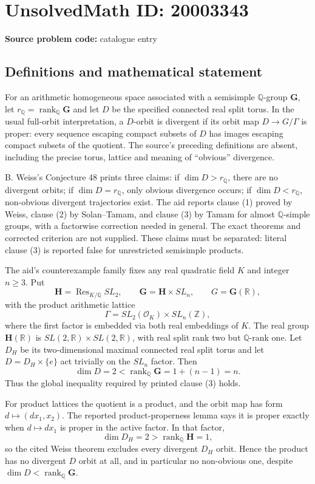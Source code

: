 \documentclass[11pt]{article}
\newcommand{\Z}{\mathbb{Z}}
\newcommand{\Q}{\mathbb{Q}}
\newcommand{\R}{\mathbb{R}}
\begin{document}
\section*{UnsolvedMath ID: 20003343}
\textbf{Source problem code:} catalogue entry
\subsection{Definitions and mathematical statement}
For an arithmetic homogeneous space associated with a semisimple $\Q$-group $\mathbf G$, let $r_{\Q}=\operatorname{rank}_{\Q}\mathbf G$ and let $D$ be the specified connected real split torus. In the usual full-orbit interpretation, a $D$-orbit is divergent if its orbit map $D\to G/\Gamma$ is proper: every sequence escaping compact subsets of $D$ has images escaping compact subsets of the quotient. The source's preceding definitions are absent, including the precise torus, lattice and meaning of ``obvious'' divergence.

B. Weiss's Conjecture 48 prints three claims: if $\dim D>r_{\Q}$, there are no divergent orbits; if $\dim D=r_{\Q}$, only obvious divergence occurs; if $\dim D<r_{\Q}$, non-obvious divergent trajectories exist. The aid reports clause (1) proved by Weiss, clause (2) by Solan--Tamam, and clause (3) by Tamam for almost $\Q$-simple groups, with a factorwise correction needed in general. The exact theorems and corrected criterion are not supplied. These claims must be separated: literal clause (3) is reported false for unrestricted semisimple products.

The aid's counterexample family fixes any real quadratic field $K$ and integer $n\geq3$. Put
\[
 \mathbf H=\operatorname{Res}_{K/\Q}SL_2,\qquad
 \mathbf G=\mathbf H\times SL_n,
 \qquad G=\mathbf G(\R),
\]
with the product arithmetic lattice
\[
 \Gamma=SL_2(\mathcal O_K)\times SL_n(\Z),
\]
where the first factor is embedded via both real embeddings of $K$. The real group $\mathbf H(\R)$ is $SL(2,\R)\times SL(2,\R)$, with real split rank two but $\Q$-rank one. Let $D_H$ be its two-dimensional maximal connected real split torus and let $D=D_H\times\{e\}$ act trivially on the $SL_n$ factor. Then
\[
 \dim D=2<\operatorname{rank}_{\Q}\mathbf G
 =1+(n-1)=n.
\]
Thus the global inequality required by printed clause (3) holds.

For product lattices the quotient is a product, and the orbit map has form $d\mapsto(dx_1,x_2)$. The reported product-properness lemma says it is proper exactly when $d\mapsto dx_1$ is proper in the active factor. In that factor,
\[
 \dim D_H=2>\operatorname{rank}_{\Q}\mathbf H=1,
\]
so the cited Weiss theorem excludes every divergent $D_H$ orbit. Hence the product has no divergent $D$ orbit at all, and in particular no non-obvious one, despite $\dim D<\operatorname{rank}_{\Q}\mathbf G$.
\end{document}
